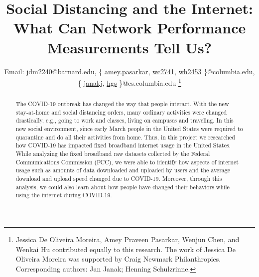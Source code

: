 \documentclass[conference,10pt]{IEEEtran}
\begin{document}
\title{Social Distancing and the Internet: What Can Network Performance Measurements Tell Us?}

\author{
    Email:
    jdm2240@barnard.edu,
    \{%
      \href{mailto:amey.pasarkar@columbia.edu}{\color{black}amey.pasarkar},%
      \href{mailto:wc2741@columbia.edu}{\color{black}wc2741},%
      \href{mailto:wh2453@columbia.edu}{\color{black}wh2453}%
    \}@columbia.edu,
    \{%
      \href{mailto:janakj@cs.columbia.edu}{\color{black}janakj},%
      \href{mailto:hgs@cs.columbia.edu}{\color{black}hgs}%
    \}@cs.columbia.edu
    \thanks{Jessica De Oliveira Moreira, Amey Praveen Pasarkar, Wenjun Chen, and Wenkai Hu contributed equally to this research. The work of Jessica De Oliveira Moreira was supported by Craig Newmark Philanthropies. Corresponding authors: Jan Janak; Henning Schulzrinne.}
}

\maketitle

\begin{abstract}
The COVID-19 outbreak has changed the way that people interact. With the new stay-at-home and social distancing orders, many ordinary activities were changed drastically, e.g., going to work and classes, living on campuses and traveling. In this new social environment, since early March people in the United States were required to quarantine and do all their activities from home. Thus, in this project we researched how COVID-19 has impacted fixed broadband internet usage in the  United States. While analyzing the fixed broadband raw datasets collected by the Federal Communications Commission (FCC), we were able to identify how aspects of internet usage such as amounts of data downloaded and uploaded by users and the average download and upload speed changed due to COVID-19. Moreover, through this analysis, we could also learn about how people have changed their behaviors while using the internet during COVID-19.
\end{abstract}
\end{document}
